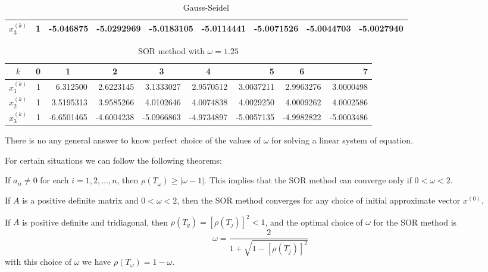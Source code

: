 \documentclass[../main-sheet.tex]{subfiles}
\begin{document}
\begin{ex}
\begin{table}[H]
\begin{tabular}{crrrrrrrr}
            \(x_3^{(k)}\) & 1 & -5.046875 & -5.0292969 & -5.0183105 & -5.0114441 & -5.0071526 & -5.0044703 & -5.0027940 \\ \bottomrule
            \end{tabular}
            \caption{Gauss-Seidel}
        \end{table}
        \begin{table}[H]
            \centering
            \begin{tabular}{crrrrrrrr}
            \toprule
            \(k\) & \multicolumn{1}{c}{0} & \multicolumn{1}{c}{1} & \multicolumn{1}{c}{2} & \multicolumn{1}{c}{3} & \multicolumn{1}{c}{4} & 5 & \multicolumn{1}{c}{6} & 7 \\ \midrule
            \(x_1^{(k)}\) & 1 & 6.312500 & 2.6223145 & 3.1333027 & 2.9570512 & 3.0037211 & 2.9963276 & 3.0000498 \\
            \(x_2^{(k)}\) & 1 & 3.5195313 & 3.9585266 & 4.0102646 & 4.0074838 & 4.0029250 & 4.0009262 & 4.0002586 \\
            \(x_3^{(k)}\) & 1 & -6.6501465 & -4.6004238 & -5.0966863 & -4.9734897 & -5.0057135 & -4.9982822 & -5.0003486 \\ \bottomrule
            \end{tabular}
            \caption{SOR method with \(\omega=1.25\)}
        \end{table}
    \end{ex}
    \begin{note}
        There is no any general answer to know perfect choice of the values of \(\omega\) for solving a linear system of equation.
    \end{note}
    For certain situations we can follow the following theorems:
    \begin{thm}[Kahan]
        If \(a_{ii}\neq 0\) for each \(i=1,2,\dots,n\), then \(\rho(T_\omega)\geq \vert \omega-1\vert\). This implies that the SOR method can converge only if \(0< \omega <2\).
    \end{thm}
    \begin{thm}
        If \(A\) is a positive definite matrix and \(0< \omega <2\), then the SOR method converges for any choice of initial approximate vector \(x^{(0)}\).
    \end{thm}
    \begin{thm}
        If \(A\) is positive definite and tridiagonal, then \(\rho(T_g)=\left[ \rho(T_j) \right]^2 <1\), and the optimal choice of \(\omega\) for the SOR method is
        \[
            \omega=\frac{2}{1+\sqrt{1-\left[ \rho(T_j) \right]^2}}
        \]
        with this choice of \(\omega\) we have \(\rho(T_\omega)=1-\omega\).
    \end{thm}
\end{document}
